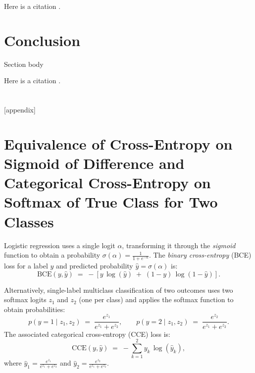\documentclass[twoside,11pt]{article}
\begin{document}
Here is a citation \cite{chow:68}.

\section{Conclusion}

Section body

Here is a citation \cite{chow:68}.




\newpage

\appendix
\section{}
\label{app:theorem}



[appendix]

\section{Equivalence of Cross-Entropy on Sigmoid of Difference
and Categorical Cross-Entropy on Softmax of True Class for Two Classes}

Logistic regression uses 
a single logit \(\alpha\), transforming it through the \emph{sigmoid} function to obtain 
a probability \(\sigma(\alpha) = \frac{1}{1 + e^{-\alpha}} \). The \emph{binary cross-entropy} 
(BCE) loss for a label $y$ and predicted probability \(\hat{y} = \sigma(\alpha)\) is:
\[
  \text{BCE}(y, \hat{y})
  \;=\;
  - \left[
      y \,\log(\hat{y})
      \;+\;
      (1 - y)\,\log (1 - \hat{y})
    \right].
\]

Alternatively, single-label multiclass classification of two 
outcomes uses two softmax logits \(z_1\) and \(z_2\) (one per class) 
and applies the softmax function to obtain probabilities:
\[
  p(y=1 \mid z_1, z_2)
  \;=\;
  \frac{e^{z_1}}{e^{z_1} + e^{z_2}},
  \qquad
  p(y=2 \mid z_1, z_2)
  \;=\;
  \frac{e^{z_2}}{e^{z_1} + e^{z_2}}.
\]
The associated categorical cross-entropy (CCE) loss is: 
\[
  \text{CCE}(y, \hat{y})
  \;=\;
  -\sum_{k=1}^2 y_k \,\log (\hat{y}_k ),
\]
where \(\hat{y}_1 = \frac{e^{z_1}}{e^{z_1} + e^{z_2}}\) and 
\(\hat{y}_2 = \frac{e^{z_2}}{e^{z_1} + e^{z_2}}\).
\end{document}
